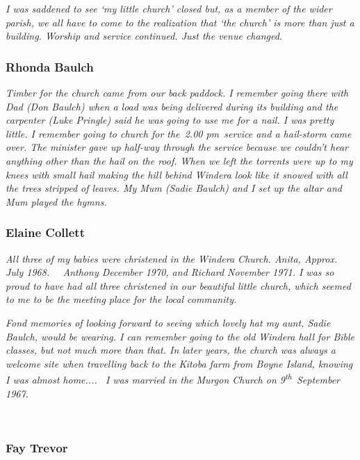 \emph{I was saddened to see `my little church' closed but, as a member of the wider parish, we all have to come to the realization that `the church' is more than just a building. Worship and service continued. Just the venue changed.}

\hypertarget{rhonda-baulch}{%
\subsubsection{Rhonda Baulch}\label{rhonda-baulch}}

\emph{Timber for the church came from our back paddock. I remember going there with Dad (Don Baulch) when a load was being delivered during its building and the carpenter (Luke Pringle) said he was going to use me for a nail. I was pretty little. I remember going to church for the~2.00 pm~service and a hail-storm came over. The minister gave up half-way through the service because we couldn't hear anything other than the hail on the roof. When we left the torrents were up to my knees with small hail making the hill behind Windera look like it snowed with all the trees stripped of leaves. My Mum (Sadie Baulch) and I set up the altar and Mum played the hymns.}

\hypertarget{elaine-collett}{%
\subsubsection{Elaine Collett}\label{elaine-collett}}

\emph{All three of my babies were christened in the Windera Church. Anita, Approx. July 1968.~~ Anthony December 1970, and Richard November 1971. I was so proud to have had all three christened in our beautiful little church, which seemed to me to be the meeting place for the local community.}

\emph{Fond memories of looking forward to seeing which lovely hat my aunt, Sadie Baulch, would be wearing. I can remember going to the old Windera hall for Bible classes, but not much more than that. In later years, the church was always a welcome site when travelling back to the Kitoba farm from Boyne Island, knowing I was almost home.... ~I was married in the Murgon Church on 9\textsuperscript{th}~September 1967.}

~

\hypertarget{fay-trevor}{%
\subsubsection{Fay Trevor}\label{fay-trevor}}

